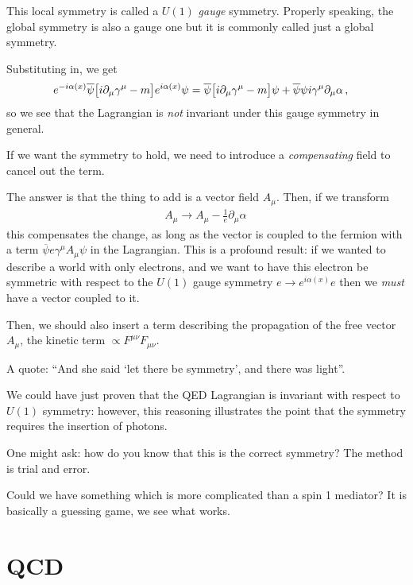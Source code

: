 \documentclass[main.tex]{subfiles}
\begin{document}
This local symmetry is called a \(U(1)\) \emph{gauge} symmetry. 
Properly speaking, the global symmetry is also a gauge one but it is commonly called just a global symmetry. 

Substituting in, we get 
%
\begin{align}
e^{-i \alpha (x)} \overline{\psi} \qty[i \partial_{\mu } \gamma^{\mu } - m] e^{i \alpha (x)} \psi  
&= 
\overline{\psi} \qty[i \partial_{\mu } \gamma^{\mu } - m] \psi  
 + \overline{\psi} \psi i \gamma^{\mu }\partial_{\mu } \alpha 
\,,
\end{align}
%
so we see that the Lagrangian is \emph{not} invariant under this gauge symmetry in general. 

If we want the symmetry to hold, we need to introduce a \emph{compensating} field to cancel out the term.

The answer is that the thing to add is a vector field \(A_{\mu }\). 
Then, if we transform 
%
\begin{align}
A_{\mu } \to A_{\mu } - \frac{1}{e} \partial_{\mu } \alpha 
\,
\end{align}
%
this compensates the change, as long as the vector is coupled to the fermion with a term \(\overline{\psi} e \gamma^{\mu } A_{\mu } \psi \) in the Lagrangian. 
This is a profound result: if we wanted to describe a world with only electrons, and we want to have this electron be symmetric with respect to the \(U(1)\) gauge symmetry \(e \to e^{i \alpha (x)} e\) then we \emph{must} have a vector coupled to it. 

Then, we should also insert a term describing the propagation of the free vector \(A_{\mu }\), the kinetic term \(\propto F^{\mu \nu } F_{\mu \nu }\).

A quote: ``And she said `let there be symmetry', and there was light''.

We could have just proven that the QED Lagrangian is invariant with respect to \(U(1)\) symmetry: however, this reasoning illustrates the point that the symmetry requires the insertion of photons. 

One might ask: how do you know that this is the correct symmetry? 
The method is trial and error. 

Could we have something which is more complicated than a spin 1 mediator? It is basically a guessing game, we see what works. 

\section{QCD}
\end{document}
